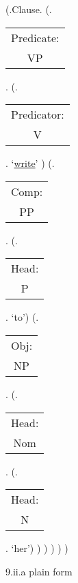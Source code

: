 \documentclass[12pt,letterpaper]{article}
\begin{document}
\begin{figure}
	\begin{center}
		\begin{parsetree}
			(.Clause.
			(.\begin{tabular}{c}Predicate:\\VP\end{tabular}.
			(.\begin{tabular}{c}Predicator:\\V\end{tabular}. `\underline{write}' )
			(.\begin{tabular}{c}Comp:\\PP\end{tabular}.
			(.\begin{tabular}{c}Head:\\P\end{tabular}. `to')
			(.\begin{tabular}{c}Obj:\\NP\end{tabular}. 
			(.\begin{tabular}{c}Head:\\Nom\end{tabular}. 
			(.\begin{tabular}{c}Head:\\N\end{tabular}. `her')
			)
			)
			)
			)
			)
			
			
		\end{parsetree}
		\hfill \break \hfill \break
		9.ii.a plain form
	\end{center}
\end{figure}
\end{document}
